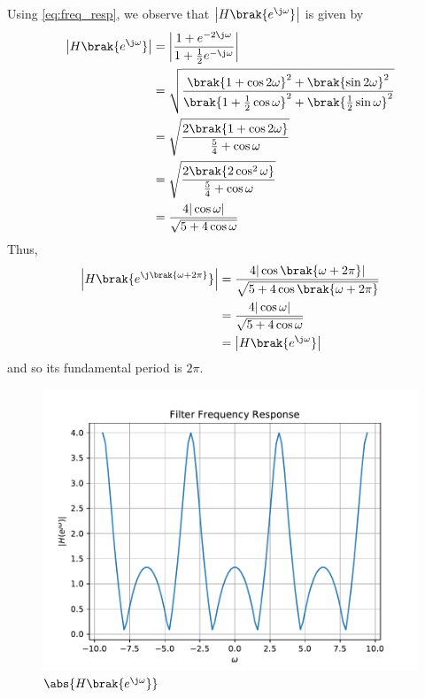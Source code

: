 \documentclass[journal,12pt,twocolumn]{IEEEtran}
\renewcommand\thesection{\arabic{section}}
\begin{document}
\begin{enumerate}[label=\thesection.\arabic*]
\begin{lstlisting}
\end{lstlisting}
Using \eqref{eq:freq_resp}, we observe that $\left|H\brak{e^{\j\omega}}\right|$ is given by
\begin{align}
	\left|H\brak{e^{\j\omega}}\right| &= \left|\frac{1 + e^{-2\j\omega}}{1 + \frac{1}{2}e^{-\j\omega}}\right| \\
	&= \sqrt{\frac{\brak{1 + \cos{2\omega}}^2 + \brak{\sin{2\omega}}^2}{\brak{1 + \frac{1}{2}\cos{\omega}}^2 + \brak{\frac{1}{2}\sin{\omega}}^2}}\\
	&= \sqrt{\frac{2\brak{1 + \cos{2\omega}}}{\frac{5}{4} + \cos{\omega}}} \\
	&= \sqrt{\frac{2\brak{2\cos^2{\omega}}}{\frac{5}{4} + \cos{\omega}}} \\
	&= \frac{4|\cos{\omega}|}{\sqrt{5 + 4\cos{\omega}}}
\end{align}
Thus,
\begin{align}
	\left|H\brak{e^{\j\brak{\omega + 2\pi}}}\right| &= \frac{4|\cos\brak{\omega + 2\pi}|}{\sqrt{5 + 4\cos\brak{\omega + 2\pi}}} \\
	&= \frac{4|\cos{\omega}|}{\sqrt{5 + 4\cos{\omega}}} \\
	&= \left|H\brak{e^{\j\omega}}\right|	
\end{align}
and so its fundamental period is $2\pi$.
\begin{figure}[!ht]
	\centering
	\includegraphics[width=\columnwidth]{./figs/dtft}
	\caption{$\abs{H\brak{e^{\j\omega}}}$}
	\label{fig:dtft}
\end{figure}


\end{enumerate}
\end{document}

